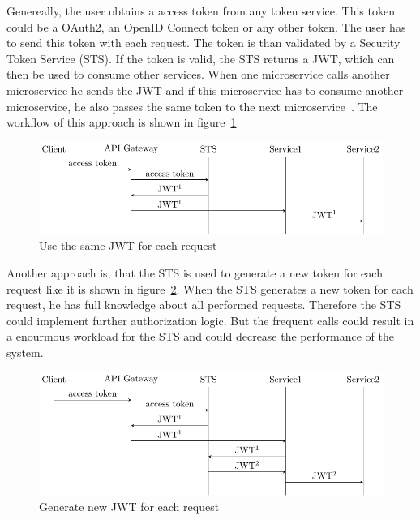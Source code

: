 Genereally, the user obtains a access token from any token service.
This token could be a OAuth2, an OpenID Connect token or any other token.
The user has to send this token with each request.
The token is than validated by a Security Token Service (STS).
If the token is valid, the STS returns a JWT, which can then be used to consume other services.
When one microservice calls another microservice he sends the JWT and if this microservice has to consume another microservice, he also passes the same token to the next microservice~\cite{dias2020microservices}.
The workflow of this approach is shown in figure~\ref{fig:mtls_id_1}
\begin{figure}
    \centering
	\includegraphics{images/authentication-mechanisms/TikZ_jwt_identity_1.pdf}
    \caption{Use the same JWT for each request~\cite{dias2020microservices}}
	\label{fig:mtls_id_1}
\end{figure}

Another approach is, that the STS is used to generate a new token for each request like it is shown in figure~\ref{fig:mtls_id_2}.
When the STS generates a new token for each request, he has full knowledge about all performed requests.
Therefore the STS could implement further authorization logic.
But the frequent calls could result in a enourmous workload for the STS and could decrease the performance of the system.

\begin{figure}[H]
	\centering
	\includegraphics{images/authentication-mechanisms/TikZ_jwt_identity_2.pdf}
	\caption{Generate new JWT for each request~\cite{dias2020microservices}}
	\label{fig:mtls_id_2}
\end{figure}


